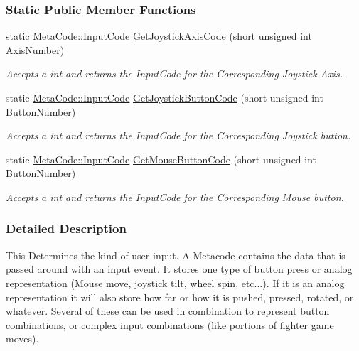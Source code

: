 \subsubsection*{Static Public Member Functions}
\begin{DoxyCompactItemize}
\item 
static \hyperlink{classMezzanine_1_1MetaCode_a3b5633f0145bf3287cf53a3f05b5563c}{MetaCode::InputCode} \hyperlink{classMezzanine_1_1MetaCode_ab8b87a3816659517a8307d510189f8f7}{GetJoystickAxisCode} (short unsigned int AxisNumber)
\begin{DoxyCompactList}\small\item\em Accepts a int and returns the InputCode for the Corresponding Joystick Axis. \item\end{DoxyCompactList}\item 
static \hyperlink{classMezzanine_1_1MetaCode_a3b5633f0145bf3287cf53a3f05b5563c}{MetaCode::InputCode} \hyperlink{classMezzanine_1_1MetaCode_aedfc7351865f96d3d354fcbfeb4e1fc1}{GetJoystickButtonCode} (short unsigned int ButtonNumber)
\begin{DoxyCompactList}\small\item\em Accepts a int and returns the InputCode for the Corresponding Joystick button. \item\end{DoxyCompactList}\item 
static \hyperlink{classMezzanine_1_1MetaCode_a3b5633f0145bf3287cf53a3f05b5563c}{MetaCode::InputCode} \hyperlink{classMezzanine_1_1MetaCode_af818525aa7815c16a7e82f7e432a321e}{GetMouseButtonCode} (short unsigned int ButtonNumber)
\begin{DoxyCompactList}\small\item\em Accepts a int and returns the InputCode for the Corresponding Mouse button. \item\end{DoxyCompactList}\end{DoxyCompactItemize}


\subsubsection{Detailed Description}
This Determines the kind of user input. A Metacode contains the data that is passed around with an input event. It stores one type of button press or analog representation (Mouse move, joystick tilt, wheel spin, etc...). If it is an analog representation it will also store how far or how it is pushed, pressed, rotated, or whatever. Several of these can be used in combination to represent button combinations, or complex input combinations (like portions of fighter game moves). 

